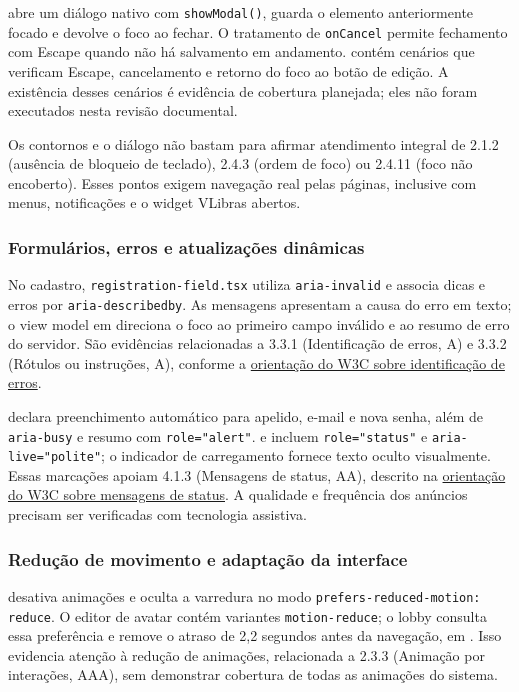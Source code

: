 \documentclass[12pt,a4paper]{article}
\begin{document}
 abre um diálogo nativo com \texttt{showModal()}, guarda o elemento anteriormente focado e devolve o foco ao fechar. O tratamento de \texttt{onCancel} permite fechamento com Escape quando não há salvamento em andamento.  contém cenários que verificam Escape, cancelamento e retorno do foco ao botão de edição. A existência desses cenários é evidência de cobertura planejada; eles não foram executados nesta revisão documental.

Os contornos e o diálogo não bastam para afirmar atendimento integral de 2.1.2 (ausência de bloqueio de teclado), 2.4.3 (ordem de foco) ou 2.4.11 (foco não encoberto). Esses pontos exigem navegação real pelas páginas, inclusive com menus, notificações e o widget VLibras abertos.

\subsubsection{Formulários, erros e atualizações dinâmicas}
No cadastro, \texttt{registration-field.tsx} utiliza \texttt{aria-invalid} e associa dicas e erros por \texttt{aria-describedby}. As mensagens apresentam a causa do erro em texto; o view model em  direciona o foco ao primeiro campo inválido e ao resumo de erro do servidor. São evidências relacionadas a 3.3.1 (Identificação de erros, A) e 3.3.2 (Rótulos ou instruções, A), conforme a \href{https://www.w3.org/WAI/WCAG22/Understanding/error-identification.html}{orientação do W3C sobre identificação de erros}.

 declara preenchimento automático para apelido, e-mail e nova senha, além de \texttt{aria-busy} e resumo com \texttt{role="alert"}.  e  incluem \texttt{role="status"} e \texttt{aria-live="polite"}; o indicador de carregamento fornece texto oculto visualmente. Essas marcações apoiam 4.1.3 (Mensagens de status, AA), descrito na \href{https://www.w3.org/WAI/WCAG22/Understanding/status-messages.html}{orientação do W3C sobre mensagens de status}. A qualidade e frequência dos anúncios precisam ser verificadas com tecnologia assistiva.

\subsubsection{Redução de movimento e adaptação da interface}
 desativa animações e oculta a varredura no modo \texttt{prefers-reduced-motion: reduce}. O editor de avatar contém variantes \texttt{motion-reduce}; o lobby consulta essa preferência e remove o atraso de 2,2 segundos antes da navegação, em . Isso evidencia atenção à redução de animações, relacionada a 2.3.3 (Animação por interações, AAA), sem demonstrar cobertura de todas as animações do sistema.
\end{document}
